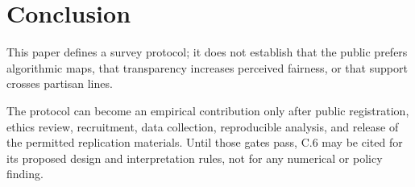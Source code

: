 \section{Conclusion}
\label{sec:conclusion}

This paper defines a survey protocol; it does not establish that the public
prefers algorithmic maps, that transparency increases perceived fairness, or
that support crosses partisan lines.

The protocol can become an empirical contribution only after public
registration, ethics review, recruitment, data collection, reproducible
analysis, and release of the permitted replication materials. Until those
gates pass, C.6 may be cited for its proposed design and interpretation rules,
not for any numerical or policy finding.
